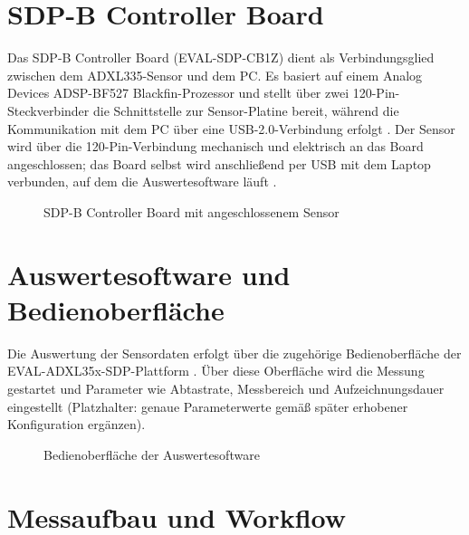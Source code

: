 \section{SDP-B Controller Board}
\label{sec:grundlagen-sdpb}

Das SDP-B Controller Board (EVAL-SDP-CB1Z) dient als Verbindungsglied zwischen dem ADXL335-Sensor und dem PC. Es basiert auf einem Analog Devices ADSP-BF527 Blackfin-Prozessor und stellt über zwei 120-Pin-Steckverbinder die Schnittstelle zur Sensor-Platine bereit, während die Kommunikation mit dem PC über eine USB-2.0-Verbindung erfolgt \cite{ADI_UG277}. Der Sensor wird über die 120-Pin-Verbindung mechanisch und elektrisch an das Board angeschlossen; das Board selbst wird anschließend per USB mit dem Laptop verbunden, auf dem die Auswertesoftware läuft \cite{ADI_UG277}.

\begin{figure}[htbp]
\centering
\caption{SDP-B Controller Board mit angeschlossenem Sensor}
\label{fig:sdpb-foto}
\end{figure}

\section{Auswertesoftware und Bedienoberfläche}
\label{sec:grundlagen-software}

Die Auswertung der Sensordaten erfolgt über die zugehörige Bedienoberfläche der EVAL-ADXL35x-SDP-Plattform \cite{ADI_UG2190}. Über diese Oberfläche wird die Messung gestartet und Parameter wie Abtastrate, Messbereich und Aufzeichnungsdauer eingestellt (Platzhalter: genaue Parameterwerte gemäß später erhobener Konfiguration ergänzen).

\begin{figure}[htbp]
\centering
\caption{Bedienoberfläche der Auswertesoftware}
\label{fig:gui-screenshot}
\end{figure}

\section{Messaufbau und Workflow}
\label{sec:grundlagen-workflow}

